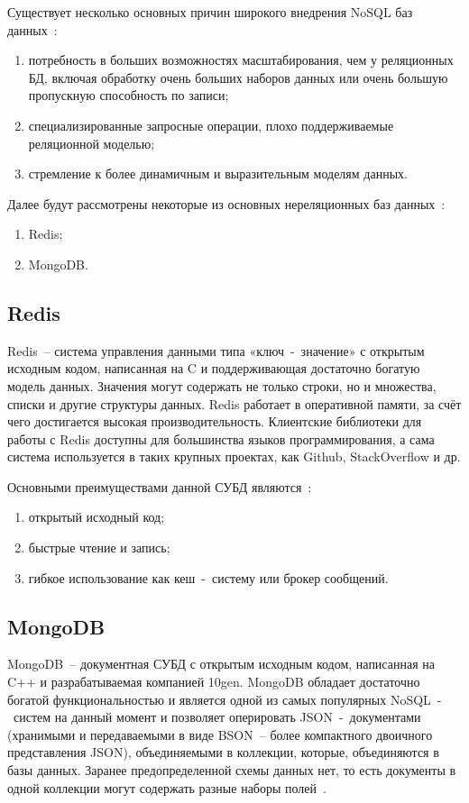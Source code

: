 Существует несколько основных причин широкого внедрения NoSQL баз данных~\cite{highloadApps}:
\begin{enumerate}
	\item потребность в больших возможностях масштабирования, чем у реляционных БД, включая обработку очень больших наборов данных или очень большую пропускную способность по записи;
	\item специализированные запросные операции, плохо поддерживаемые реляционной моделью;
	\item стремление к более динамичным и выразительным моделям данных.
\end{enumerate}

Далее будут рассмотрены некоторые из основных нереляционных баз данных~\cite{lections}:
\begin{enumerate}
	\item Redis;
	\item MongoDB.
\end{enumerate}

\subsection{Redis}

Redis~-- система управления данными типа «ключ~-~значение» с открытым исходным кодом, написанная на C и поддерживающая достаточно богатую модель данных.
Значения могут содержать не только строки, но и множества, списки и другие структуры данных.
Redis работает в оперативной памяти, за счёт чего достигается высокая производительность. 
Клиентские библиотеки для работы с Redis доступны для большинства языков программирования, а сама система используется в таких крупных проектах, как Github, StackOverflow и др.

Основными преимуществами данной СУБД являются~\cite{cmpNosql1}:
\begin{enumerate}
	\item открытый исходный код;
	\item быстрые чтение и запись;
	\item гибкое использование как кеш~-~систему или брокер сообщений.
\end{enumerate}

\subsection{MongoDB}

MongoDB~-- документная СУБД с открытым исходным кодом, написанная на C++ и разрабатываемая компанией 10gen.
MongoDB обладает достаточно богатой функциональностью и является одной из самых популярных NoSQL~-~систем на данный момент и позволяет оперировать JSON~-~документами (хранимыми и передаваемыми в виде BSON~-- более компактного двоичного представления JSON), объединяемыми в коллекции, которые, объединяются в базы данных.
Заранее предопределенной схемы данных нет, то есть документы в одной коллекции могут содержать разные наборы полей~\cite{nosql}.

